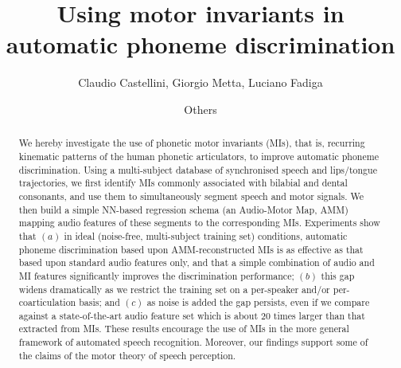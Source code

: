 \documentclass{pnastwo}
\begin{document}

\title{Using motor invariants in automatic phoneme discrimination}

\author{
Claudio Castellini,
Giorgio Metta,
Luciano Fadiga \and
Others
}


\maketitle

\begin{article}

\begin{abstract}

  We hereby investigate the use of phonetic motor invariants (MIs),
  that is, recurring kinematic patterns of the human phonetic articulators,
  to improve automatic phoneme discrimination. Using a multi-subject
  database of synchronised speech and lips/tongue trajectories, we first
  identify MIs commonly associated with bilabial and dental consonants,
  and use them to simultaneously segment speech and motor signals.
  We then build a simple NN-based regression schema (an Audio-Motor
  Map, AMM) mapping audio features of these segments to the corresponding
  MIs. Experiments show that $(a)$ in ideal (noise-free, multi-subject training set)
  conditions, automatic phoneme discrimination based upon AMM-reconstructed
  MIs is as effective as that based upon standard audio features
  only, and that a simple combination of audio and MI features significantly
  improves the discrimination performance; $(b)$ this gap widens dramatically
  as we restrict the training set on a per-speaker and/or per-coarticulation basis;
  and $(c)$ as noise is added the gap persists, even if we compare against
  a state-of-the-art audio feature set which is about $20$ times larger than
  that extracted from MIs. These results encourage the use of MIs in the more
  general framework of automated speech recognition. Moreover, our findings 
  support some of the claims of the motor theory of speech perception.

\end{abstract}


\end{article}
\end{document}

